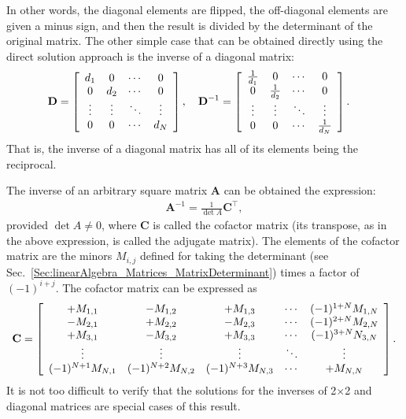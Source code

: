 In other words, the diagonal elements are flipped, the off-diagonal elements are given a minus sign, and then the result is divided by the determinant of the original matrix. The other simple case that can be obtained directly using the direct solution approach is the inverse of a diagonal matrix:
\begin{align}
  \mathbf{D}      = \left[ \begin{array}{c c c c} d_1 & 0   & \cdots & 0 \\ 
  													0 & d_2 & \cdots & 0 \\ 
											   \vdots & \vdots & \ddots & \vdots \\
											  	    0 & 0   & \cdots & d_N \\ \end{array} \right], \quad
  \mathbf{D}^{-1} = \left[ \begin{array}{c c c c} \frac{1}{d_1} & 0   & \cdots & 0 \\ 
  													0 & \frac{1}{d_2} & \cdots & 0 \\ 
											   \vdots & \vdots & \ddots & \vdots \\
											  	    0 & 0   & \cdots & \frac{1}{d_N} \\ \end{array} \right] . \quad
\end{align}
That is, the inverse of a diagonal matrix has all of its elements being the reciprocal. 

The inverse of an arbitrary square matrix $\mathbf{A}$ can be obtained the expression:
\begin{align}
  \mathbf{A}^{-1} = \frac{1}{\det{A}} \mathbf{C}^\top,
\end{align}
provided $\det{A} \ne 0$, where $\mathbf{C}$ is called the cofactor matrix (its transpose, as in the above expression, is called the adjugate matrix). The elements of the cofactor matrix are the minors $M_{i,j}$ defined for taking the determinant (see Sec.~\ref{Sec:linearAlgebra_Matrices_MatrixDeterminant}) times a factor of $(-1)^{i+j}$. The cofactor matrix can be expressed as
\begin{align}
  \mathbf{C} = \left[ \begin{array}{c c c c c} 
      +M_{1,1} & -M_{1,2} & +M_{1,3} & \cdots & (-1)^{1+N} M_{1,N} \\ 
      -M_{2,1} & +M_{2,2} & -M_{2,3} & \cdots & (-1)^{2+N} M_{2,N} \\
      +M_{3,1} & -M_{3,2} & +M_{3,3} & \cdots & (-1)^{3+N} N_{3,N} \\
      \vdots   & \vdots   & \vdots   & \ddots & \vdots             \\
      (-1)^{N+1} M_{N,1} & (-1)^{N+2} M_{N,2} & (-1)^{N+3} M_{N,3} & \cdots &  +M_{N,N} \\ \end{array} \right] .
\end{align}
It is not too difficult to verify that the solutions for the inverses of 2$\times$2 and diagonal matrices are special cases of this result. 

